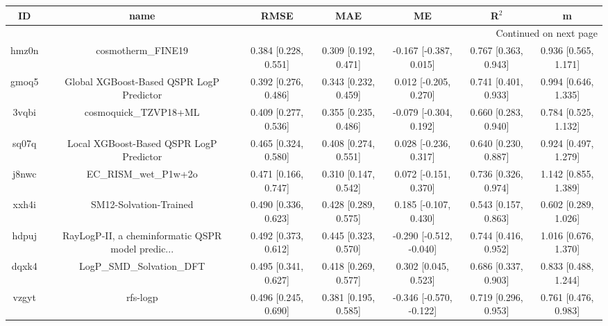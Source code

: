 \documentclass{article}
\begin{document}
\begin{center}
\begin{longtable}{|ccccccc|}
\toprule
    ID &                                               name &                  RMSE &                   MAE &                       ME &                 R$^2$ &                       m \\
\midrule
\endhead
\midrule
\multicolumn{7}{r}{{Continued on next page}} \\
\midrule
\endfoot

\bottomrule
\endlastfoot
 hmz0n &                                 cosmotherm\_FINE19 &  0.384 [0.228, 0.551] &  0.309 [0.192, 0.471] &   -0.167 [-0.387, 0.015] &  0.767 [0.363, 0.943] &    0.936 [0.565, 1.171] \\
 gmoq5 &           Global XGBoost-Based QSPR LogP Predictor &  0.392 [0.276, 0.486] &  0.343 [0.232, 0.459] &    0.012 [-0.205, 0.270] &  0.741 [0.401, 0.933] &    0.994 [0.646, 1.335] \\
 3vqbi &                              cosmoquick\_TZVP18+ML &  0.409 [0.277, 0.536] &  0.355 [0.235, 0.486] &   -0.079 [-0.304, 0.192] &  0.660 [0.283, 0.940] &    0.784 [0.525, 1.132] \\
 sq07q &            Local XGBoost-Based QSPR LogP Predictor &  0.465 [0.324, 0.580] &  0.408 [0.274, 0.551] &    0.028 [-0.236, 0.317] &  0.640 [0.230, 0.887] &    0.924 [0.497, 1.279] \\
 j8nwc &                              EC\_RISM\_wet\_P1w+2o &  0.471 [0.166, 0.747] &  0.310 [0.147, 0.542] &    0.072 [-0.151, 0.370] &  0.736 [0.326, 0.974] &    1.142 [0.855, 1.389] \\
 xxh4i &                             SM12-Solvation-Trained &  0.490 [0.336, 0.623] &  0.428 [0.289, 0.575] &    0.185 [-0.107, 0.430] &  0.543 [0.157, 0.863] &    0.602 [0.289, 1.026] \\
 hdpuj &  RayLogP-II, a cheminformatic QSPR model predic... &  0.492 [0.373, 0.612] &  0.445 [0.323, 0.570] &  -0.290 [-0.512, -0.040] &  0.744 [0.416, 0.952] &    1.016 [0.676, 1.370] \\
 dqxk4 &                          LogP\_SMD\_Solvation\_DFT &  0.495 [0.341, 0.627] &  0.418 [0.269, 0.577] &     0.302 [0.045, 0.523] &  0.686 [0.337, 0.903] &    0.833 [0.488, 1.244] \\
 vzgyt &                                           rfs-logp &  0.496 [0.245, 0.690] &  0.381 [0.195, 0.585] &  -0.346 [-0.570, -0.122] &  0.719 [0.296, 0.953] &    0.761 [0.476, 0.983] \\

\end{longtable}
\end{center}
\end{document}
